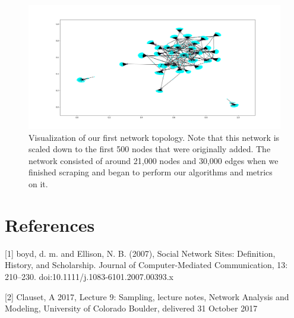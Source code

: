 \documentclass{article}
\begin{document}
\begin{figure}[h]
	\centering
	\includegraphics[scale=0.255]{take_1_visualization}
	\caption{Visualization of our first network topology.  Note that this network is scaled down to the first 500 nodes that were originally added.  The network consisted of around 21,000 nodes and 30,000 edges when we finished scraping and began to perform our algorithms and metrics on it.}
\end{figure}


\section*{References}
\small

[1] boyd, d. m. and Ellison, N. B. (2007), Social Network Sites: Definition, History, and Scholarship. Journal of Computer-Mediated Communication, 13: 210–230. doi:10.1111/j.1083-6101.2007.00393.x

[2] Clauset, A 2017, Lecture 9: Sampling, lecture notes, Network Analysis and Modeling, University of Colorado Boulder, delivered 31 October 2017
\end{document}
